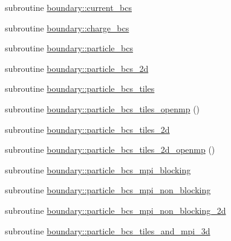 \begin{DoxyCompactItemize}
\item 
subroutine \hyperlink{namespaceboundary_a2bd382bbf256b1208d4fd3721c37ad08}{boundary\+::current\+\_\+bcs}
\item 
subroutine \hyperlink{namespaceboundary_a0b6d77029b51dd2a0e853c265885ab6c}{boundary\+::charge\+\_\+bcs}
\item 
subroutine \hyperlink{namespaceboundary_a9e7ba00d025d595683607b3ccd95bcb3}{boundary\+::particle\+\_\+bcs}
\item 
subroutine \hyperlink{namespaceboundary_aad89819169dca0b0ae8cf04748a86fb1}{boundary\+::particle\+\_\+bcs\+\_\+2d}
\item 
subroutine \hyperlink{namespaceboundary_added6cf2ea0ffc7ab618c3d9af16fade}{boundary\+::particle\+\_\+bcs\+\_\+tiles}
\item 
subroutine \hyperlink{namespaceboundary_af6d7a140eef6818609e44869b67cd3a7}{boundary\+::particle\+\_\+bcs\+\_\+tiles\+\_\+openmp} ()
\item 
subroutine \hyperlink{namespaceboundary_afb4e6ab09e288dab2bb9ce2d731e276f}{boundary\+::particle\+\_\+bcs\+\_\+tiles\+\_\+2d}
\item 
subroutine \hyperlink{namespaceboundary_a9f9517df19ef503bb2a69e63aeec91d4}{boundary\+::particle\+\_\+bcs\+\_\+tiles\+\_\+2d\+\_\+openmp} ()
\item 
subroutine \hyperlink{namespaceboundary_a1789d63402ac897697791a2fca4fa8e6}{boundary\+::particle\+\_\+bcs\+\_\+mpi\+\_\+blocking}
\item 
subroutine \hyperlink{namespaceboundary_aac32f7f65f1998963706f9d5776d29d2}{boundary\+::particle\+\_\+bcs\+\_\+mpi\+\_\+non\+\_\+blocking}
\item 
subroutine \hyperlink{namespaceboundary_a3293856926030dfea9e8ca05c61e1a5a}{boundary\+::particle\+\_\+bcs\+\_\+mpi\+\_\+non\+\_\+blocking\+\_\+2d}
\item 
subroutine \hyperlink{namespaceboundary_ac117306978e83b787afba90c3ac038f4}{boundary\+::particle\+\_\+bcs\+\_\+tiles\+\_\+and\+\_\+mpi\+\_\+3d}
\end{DoxyCompactItemize}
